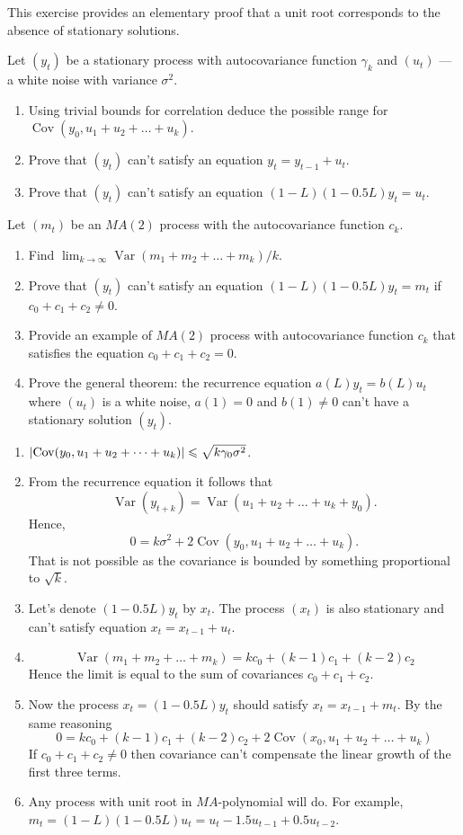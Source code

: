 \documentclass[12pt, a4paper]{article}
\DeclarePairedDelimiter{\abs}{\lvert}{\rvert}
\DeclareMathOperator{\Cov}{Cov}
\DeclareMathOperator{\Var}{Var}
\renewcommand{\leq}{\leqslant}
\newcounter{problem}[section]
\newenvironment{problem}%
{%
\refstepcounter{problem}%
     \hypertarget{problem:{\thesection.\theproblem}}{} %
     \Writetofile{solution_file}{\protect\hypertarget{soln:\thesection.\theproblem}{}}
     \begin{myenum}[label=\bfseries\protect\hyperlink{soln:\thesection.\theproblem}{\thesection.\theproblem},ref=\thesection.\theproblem]
     \item%
    }%
    {%
    \end{myenum}}
\begin{document}
\begin{problem}
This exercise provides an elementary proof that a unit root corresponds to the absence of stationary solutions.  

Let $(y_t)$ be a stationary process with autocovariance function $\gamma_k$ and $(u_t)$ — a white noise with variance $\sigma^2$.
\begin{enumerate}
  \item Using trivial bounds for correlation deduce the possible range for $\Cov(y_{0}, u_{1} + u_{2} + \dots + u_{k})$.
  \item Prove that $(y_t)$ can't satisfy an equation $y_t = y_{t - 1} + u_t$.
  \item Prove that $(y_t)$ can't satisfy an equation $(1 - L) (1 - 0.5L) y_t = u_t$.
\end{enumerate}
Let $(m_t)$ be an $MA(2)$ process with the autocovariance function $c_k$.
\begin{enumerate}[resume]
  \item Find $\lim_{k \to \infty} \Var(m_1 + m_{2} + \dots + m_{k}) / k$.
  \item Prove that $(y_t)$ can't satisfy an equation $(1 - L) (1 - 0.5L) y_t = m_t$ if $c_0 + c_1 + c_2 \neq 0$.
  \item Provide an example of $MA(2)$ process with autocovariance function $c_k$ that satisfies the equation $c_0 + c_1 + c_2 = 0$.
  \item Prove the general theorem: 
  the recurrence equation $a(L) y_t = b(L) u_t$ where $(u_t)$ is a white noise, $a(1) = 0$ and $b(1) \neq 0$ can't have a stationary solution $(y_t)$.
\end{enumerate}


\begin{sol}
\begin{enumerate}
  \item $\abs{\Cov(y_0, u_1 + u_2 + \dots + u_k)} \leq \sqrt{k \gamma_0 \sigma^2}$.
  \item From the recurrence equation it follows that 
  \[
  \Var(y_{t + k}) = \Var(u_1 + u_2 + \dots  + u_k + y_0).
  \]
  Hence, 
  \[
  0 = k \sigma^2 + 2 \Cov(y_0, u_1 + u_2 + \dots + u_k).
  \]
  That is not possible as the covariance is bounded by something proportional to $\sqrt{k}$.
  \item Let's denote $(1 - 0.5L)y_t$ by $x_t$. 
  The process $(x_t)$ is also stationary and can't satisfy equation $x_t = x_{t- 1} + u_t$.
  \item 
  \[
    \Var(m_1 + m_2 + \dots + m_k) = k c_0 + (k - 1) c_1 + (k - 2) c_2
  \]
  Hence the limit is equal to the sum of covariances $c_0 + c_1 + c_2$.
  \item Now the process $x_t = (1 - 0.5L) y_t$ should satisfy $x_t = x_{t- 1} + m_t$.
  By the same reasoning
  \[
  0 = k c_0 + (k - 1) c_1 + (k - 2) c_2 + 2 \Cov(x_0, u_1 + u_2 + \dots  + u_k)
  \]
  If $c_0 + c_1 + c_2 \neq 0$ then covariance can't compensate the linear growth of the first three terms. 
  \item Any process with unit root in $MA$-polynomial will do. 
  For example, $m_t = (1 - L) (1 - 0.5L) u_t = u_t - 1.5 u_{t-1} + 0.5 u_{t-2}$.


\end{enumerate}
\end{sol}
\end{problem}
\end{document}
